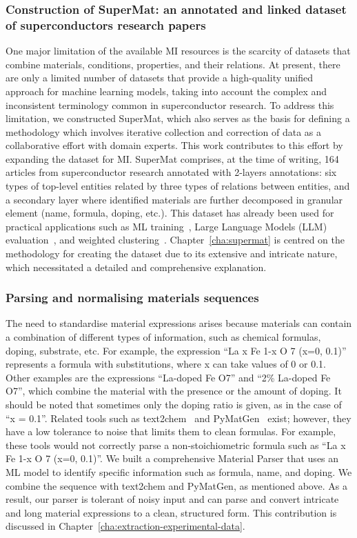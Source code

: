 \subsubsection{Construction of SuperMat: an annotated and linked dataset of superconductors research papers}
\label{sec:intro-supermat}
One major limitation of the available MI resources is the scarcity of datasets that combine materials, conditions, properties, and their relations. At present, there are only a limited number of datasets that provide a high-quality unified approach for machine learning models, taking into account the complex and inconsistent terminology common in superconductor research.
To address this limitation, we constructed SuperMat, which also serves as the basis for defining a methodology which involves iterative collection and correction of data as a collaborative effort with domain experts. This work contributes to this effort by expanding the dataset for MI.
SuperMat comprises, at the time of writing, 164 articles from superconductor research annotated with 2-layers annotations: six types of top-level entities related by three types of relations between entities, and a secondary layer where identified materials are further decomposed in granular element (name, formula, doping, etc.).
This dataset has already been used for practical applications such as ML training~\cite{foppiano2023automatic}, Large Language Models (LLM) evaluation~\cite{foppiano2024mining}, and weighted clustering~\cite{dieb2022superconductor}. 
Chapter~\ref{cha:supermat} is centred on the methodology for creating the dataset due to its extensive and intricate nature, which necessitated a detailed and comprehensive explanation.

\subsubsection{Parsing and normalising materials sequences}
\label{sec:intro-material-parser}

The need to standardise material expressions arises because materials can contain a combination of different types of information, such as chemical formulas, doping, substrate, etc. For example, the expression ``La x Fe 1-x O 7 (x=0, 0.1)'' represents a formula with substitutions, where x can take values of 0 or 0.1. 
Other examples are the expressions ``La-doped Fe O7'' and ``2\% La-doped Fe O7'', which combine the material with the presence or the amount of doping. It should be noted that sometimes only the doping ratio is given, as in the case of ``x = 0.1''. 
Related tools such as text2chem~\cite{kononova2019text} and PyMatGen~\cite{Ong2013} exist; however, they have a low tolerance to noise that limits them to clean formulas. 
For example, these tools would not correctly parse a non-stoichiometric formula such as ``La x Fe 1-x O 7 (x=0, 0.1)''. 
We built a comprehensive Material Parser that uses an ML model to identify specific information such as formula, name, and doping. We combine the sequence with text2chem and PyMatGen, as mentioned above. 
As a result, our parser is tolerant of noisy input and can parse and convert intricate and long material expressions to a clean, structured form. 
This contribution is discussed in Chapter~\ref{cha:extraction-experimental-data}.


